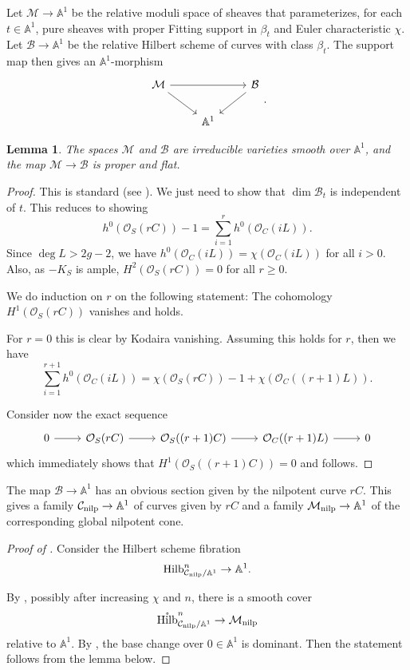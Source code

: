 \documentclass{amsart}
\theoremstyle{plain}
\newtheorem{lemma}[theorem]{Lemma}
\theoremstyle{definition}
\theoremstyle{remark}
\begin{document}
Let $\mathcal M\to\mathbb A^1$ be the relative moduli space of sheaves that parameterizes, for each $t\in\mathbb A^1$, pure sheaves with proper Fitting support in $\beta_t$ and Euler characteristic $\chi$.
Let $\mathcal B\to \mathbb A^1$ be the relative Hilbert scheme of curves with class $\beta_t$.
The support map then gives an $\mathbb A^1$-morphism
\[\begin{tikzcd}
    \mathcal M\arrow{rr}\drar&&\mathcal B\dlar\\
    &\mathbb A^1&
\end{tikzcd}.\]
\begin{lemma}
    The spaces $\mathcal M$ and $\mathcal B$ are irreducible varieties smooth over $\mathbb A^1$, and the map $\mathcal M\to\mathcal B$ is proper and flat.
\end{lemma}
\begin{proof}
    This is standard (see \cite{dCMS22}).
    We just need to show that $\dim\mathcal B_t$ is independent of $t$.
    This reduces to showing
    \begin{equation}\label{eq:dimeq_delpezzo}
        h^0(\mathcal O_S(rC))-1=\sum_{i=1}^rh^0(\mathcal O_C(iL)).
    \end{equation}
    Since $\deg L>2g-2$, we have $h^0(\mathcal O_C(iL))=\chi(\mathcal O_C(iL))$ for all $i>0$.
    Also, as $-K_S$ is ample, $H^2(\mathcal O_S(rC))=0$ for all $r\ge 0$.

    We do induction on $r$ on the following statement:
    The cohomology $H^1(\mathcal O_S(rC))$ vanishes and  holds.

    For $r=0$ this is clear by Kodaira vanishing.
    Assuming this holds for $r$, then we have
    \[\sum_{i=1}^{r+1}h^0(\mathcal O_C(iL))=\chi(\mathcal O_S(rC))-1+\chi(\mathcal O_C((r+1)L)).\]

    Consider now the exact sequence
    \[\begin{tikzcd}
        0\rar&\mathcal O_S(rC)\rar&\mathcal O_S((r+1)C)\rar&\mathcal O_C((r+1)L)\rar&0
    \end{tikzcd}\]
    which immediately shows that $H^1(\mathcal O_S((r+1)C))=0$ and  follows.
\end{proof}
The map $\mathcal B\to\mathbb A^1$ has an obvious section given by the nilpotent curve $rC$.
This gives a family $\mathcal C_{\rm nilp}\to\mathbb A^1$ of curves given by $rC$ and a family $\mathcal M_{\rm nilp}\to\mathbb A^1$ of the corresponding global nilpotent cone.
\begin{proof}[Proof of ]
    Consider the Hilbert scheme fibration
    \[\operatorname{Hilb}_{\mathcal C_{\rm nilp}/\mathbb{A}^1}^n\rightarrow \mathbb{A}^1.\]

    By , possibly after increasing $\chi$ and $n$, there is a smooth cover
    \[\mathring{\operatorname{Hilb}}^n_{\mathcal C_{\rm nilp}/\mathbb{A}^1} \rightarrow \mathcal M_{\rm nilp}\]
    relative to $\mathbb A^1$.
    By , the base change over $0\in \mathbb{A}^1$ is dominant.
    Then the statement follows from the lemma below.
\end{proof}
\end{document}

